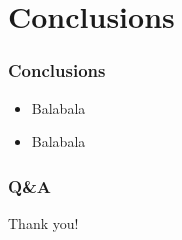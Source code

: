 

\section{Conclusions}
\begin{frame}\frametitle{Conclusions}
\begin{center}
\begin{itemize}
\item Balabala
\item Balabala
\end{itemize}
\end{center}
\end{frame}



\begin{frame}\frametitle{Q\&A}
\begin{center}
\huge{Thank you!}
\end{center}
\end{frame}






